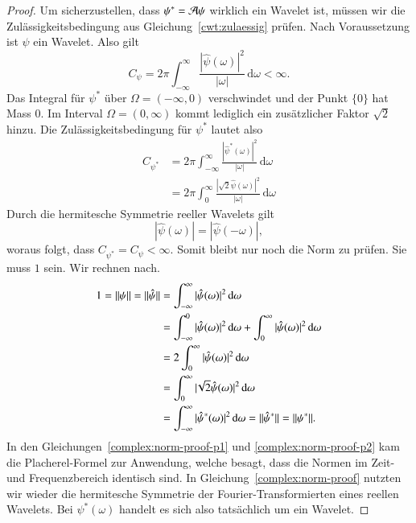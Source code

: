 \begin{proof}
	Um sicherzustellen, dass $\psi^\ast = \Ana\psi$ wirklich ein Wavelet ist, müssen wir die Zulässigkeitsbedingung aus Gleichung~\eqref{cwt:zulaessig} prüfen.
	Nach Voraussetzung ist $\psi$ ein Wavelet.
	Also gilt
	\[
	C_{\psi}
	=
	2\pi
	\int_{-\infty}^\infty \frac{|\hat{\psi}(\omega)|^2}{|\omega|}\,\mathrm{d}\omega < \infty.
	\]
	Das Integral für $\psi^\ast$ über $\Omega = (-\infty, 0)$ verschwindet und der Punkt $\lbrace 0 \rbrace$ hat Mass $0$.
	Im Interval $\Omega = (0, \infty)$ kommt lediglich ein zusätzlicher Faktor $\sqrt 2$ hinzu.
	Die Zulässigkeitsbedingung für $\psi^\ast$ lautet also
	\begin{align*}
		C_{\psi^\ast}
		&= 2\pi	\int_{-\infty}^\infty \frac{|\hat{\psi}^\ast(\omega)|^2}{|\omega|}\,\mathrm{d}\omega \\
		&= 2\pi \int_{0}^\infty \frac{|\!\sqrt{2}\hat{\psi}(\omega)|^2}{|\omega|}\,\mathrm{d}\omega
	\end{align*}
	Durch die hermitesche Symmetrie reeller Wavelets gilt 
	\[|\hat\psi(\omega)| = |\hat\psi(-\omega)|,\]
	woraus folgt, dass $C_{\psi^\ast} = C_{\psi} < \infty.$
	Somit bleibt nur noch die Norm zu prüfen.
	Sie muss $1$ sein.
	Wir rechnen nach.
	\begin{align}
	1 = \|\psi\| = \|\hat{\psi}\| 
	&= \int_{-\infty}^{\infty}|\hat{\psi}(\omega)|^2 \,\mathrm{d}\omega \label{complex:norm-proof-p1}\\
	&= \int_{-\infty}^{0}|\hat{\psi}(\omega)|^2 \,\mathrm{d}\omega +  \int_{0}^{\infty}|\hat{\psi}(\omega)|^2 \,\mathrm{d}\omega \notag\\
	&=  2\int_{0}^{\infty} |\hat{\psi}(\omega)|^2 \,\mathrm{d}\omega \label{complex:norm-proof}\\
	&=  \int_{0}^{\infty}|\!\sqrt{2}\hat{\psi}(\omega)|^2 \,\mathrm{d}\omega \notag\\
	&=  \int_{-\infty}^{\infty}|\hat{\psi}^\ast(\omega)|^2 \,\mathrm{d}\omega 
	= \|\hat{\psi}^\ast\| = \|\psi^\ast\|.\label{complex:norm-proof-p2}
	\end{align}
	In den Gleichungen~\eqref{complex:norm-proof-p1} und \eqref{complex:norm-proof-p2} kam die Placherel-Formel zur Anwendung, welche besagt, dass die Normen im Zeit- und Frequenzbereich identisch sind.
	In Gleichung~\eqref{complex:norm-proof} nutzten wir wieder die hermitesche Symmetrie der Fourier-Transformierten eines reellen Wavelets.
	Bei $\psi^\ast(\omega)$ handelt es sich also tatsächlich um ein Wavelet.
\end{proof}

